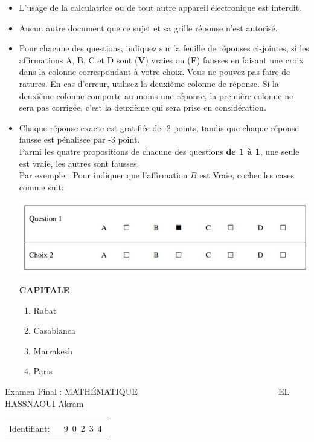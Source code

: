 \documentclass{book}%
\begin{document}
\begin{itemize}%
\item%
L'usage de la calculatrice ou de tout autre appareil électronique est interdit.%
\item%
Aucun autre document que ce sujet et sa grille réponse n'est autorisé.%
\item%
Pour chacune des questions, indiquez sur la feuille de réponses ci-jointes, si les affirmations A, B, C et D sont (\textbf{V}) vraies ou (\textbf{F}) fausses en faisant une croix dans la colonne correspondant à votre choix. Vous ne pouvez pas faire de ratures. En cas d'erreur, utilisez la deuxième colonne de réponse. Si la deuxième colonne comporte au moins une réponse, la première colonne ne sera pas corrigée, c'est la deuxième qui sera prise en considération.%
\item%
Chaque réponse exacte est gratifiée de -2 points, tandis que chaque réponse fausse est pénalisée par -3 point. \\ 	Parmi les quatre propositions de chacune des questions \textbf{de 1 à 1}, une seule est vraie, les autres sont fausses. \\ 	Par exemple : Pour indiquer que l'affirmation $B$ est Vraie, cocher les cases comme suit:  \\ \begin{center}	\includegraphics[scale=0.8]{reponses.png} \end{center}%
\thispagestyle{empty}%
\begin{exercise}%
\textbf{CAPITALE }%
\begin{enumerate}[label=\textbf{\Alph*. }]%
\item%
Rabat%
\item%
Casablanca%
\item%
Marrakesh%
\item%
Paris%
\end{enumerate}%
\end{exercise}%
\end{itemize}%
\newpage%
\thispagestyle{empty}%
Examen Final : MATHÉMATIQUE $\qquad \qquad \qquad \qquad \qquad \qquad \qquad \qquad$ EL HASSNAOUI Akram%
\begin{flushright}%
\begin{tabular}{|l|}%
\hline%
 \\%
\thispagestyle{empty}%
Identifiant: $\quad$ {\Large 9~0~2~3~4~}%
 \\%
\hline%
\end{tabular}%
\end{flushright}%
\end{document}
